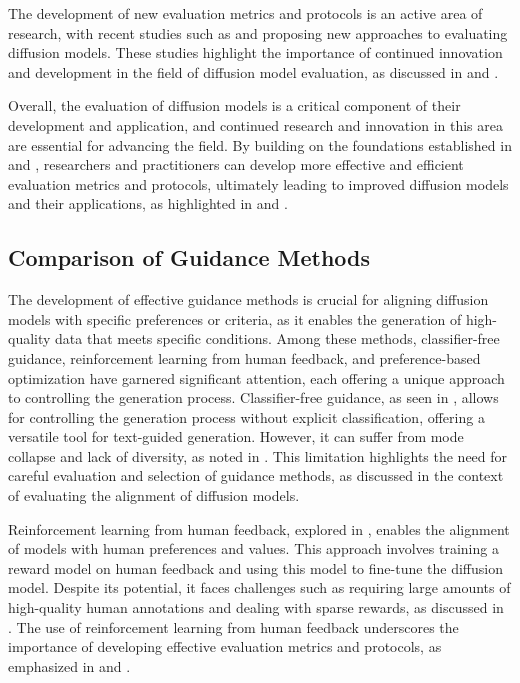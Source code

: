 \documentclass[11pt,a4paper]{article}
\begin{document}
The development of new evaluation metrics and protocols is an active area of research, with recent studies such as \cite{arxiv:2406.05191} and \cite{arxiv:2403.01639} proposing new approaches to evaluating diffusion models. These studies highlight the importance of continued innovation and development in the field of diffusion model evaluation, as discussed in \cite{doi:10.1088/1742-6596/2711/1/012005} and \cite{arxiv:2408.10207}. 

Overall, the evaluation of diffusion models is a critical component of their development and application, and continued research and innovation in this area are essential for advancing the field. By building on the foundations established in \cite{doi:10.1109/tpami.2025.3545047} and \cite{doi:10.7717/peerj-cs.1905}, researchers and practitioners can develop more effective and efficient evaluation metrics and protocols, ultimately leading to improved diffusion models and their applications, as highlighted in \cite{arxiv:2401.11708} and \cite{doi:10.1109/cvpr52734.2025.02198}.


\subsection{Comparison of Guidance Methods}


The development of effective guidance methods is crucial for aligning diffusion models with specific preferences or criteria, as it enables the generation of high-quality data that meets specific conditions. Among these methods, classifier-free guidance, reinforcement learning from human feedback, and preference-based optimization have garnered significant attention, each offering a unique approach to controlling the generation process. Classifier-free guidance, as seen in \cite{arxiv:2102.09672}, allows for controlling the generation process without explicit classification, offering a versatile tool for text-guided generation. However, it can suffer from mode collapse and lack of diversity, as noted in \cite{doi:10.1145/3626235}. This limitation highlights the need for careful evaluation and selection of guidance methods, as discussed in the context of evaluating the alignment of diffusion models.

Reinforcement learning from human feedback, explored in \cite{arxiv:2305.13301}, enables the alignment of models with human preferences and values. This approach involves training a reward model on human feedback and using this model to fine-tune the diffusion model. Despite its potential, it faces challenges such as requiring large amounts of high-quality human annotations and dealing with sparse rewards, as discussed in \cite{doi:10.1109/cvpr52734.2025.02198}. The use of reinforcement learning from human feedback underscores the importance of developing effective evaluation metrics and protocols, as emphasized in \cite{arxiv:2210.09292} and \cite{doi:10.1109/tkde.2024.3361474}.
\end{document}
